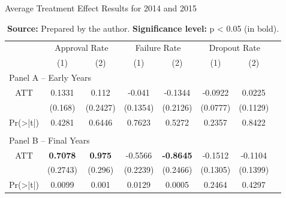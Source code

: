 \begin{table}[htbp]
    \centering
    \caption{Average Treatment Effect Results for 2014 and 2015}
    \label{tab:att_2014_2015}
        \begin{tabular}{cccccccc}
        \toprule
         & \multicolumn{2}{c}{Approval Rate} & \multicolumn{2}{c}{Failure Rate} & \multicolumn{2}{c}{Dropout Rate} \\
         & (1) & (2) & (1) & (2) & (1) & (2) \\
        \midrule
        \multicolumn{7}{l}{Panel A – Early Years} \\
        ATT       & 0.1331 & 0.112 & -0.041 & -0.1344 & -0.0922 & 0.0225 \\
                  & (0.168) & (0.2427) & (0.1354) & (0.2126) & (0.0777) & (0.1129) \\
        Pr(>|t|)  & 0.4281 & 0.6446 & 0.7623 & 0.5272 & 0.2357 & 0.8422 \\
        
        \\[-1.5ex]
        \multicolumn{7}{l}{Panel B – Final Years} \\
        ATT       & \textbf{0.7078} & \textbf{0.975} & -0.5566 & \textbf{-0.8645} & -0.1512 & -0.1104 \\
                  & (0.2743) & (0.296) & (0.2239) & (0.2466) & (0.1305) & (0.1399) \\
        Pr(>|t|)  & 0.0099 & 0.001 & 0.0129 & 0.0005 & 0.2464 & 0.4297 \\
        
        \bottomrule
        \end{tabular}
\caption*{\footnotesize\textbf{Source:} Prepared by the author. \textbf{Significance level:} p < 0.05 (in bold).}
\end{table}
